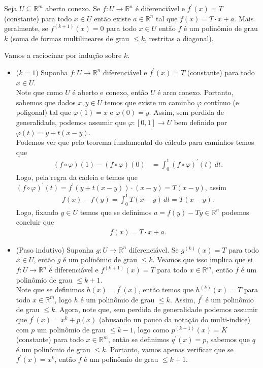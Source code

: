 \begin{homeworkProblem}[Seção 3-4]
  Seja $U\subseteq \mathbb{R}^{m}$ aberto conexo. Se $f:U\to\mathbb{R}^{n}$ é diferenciável e $f^{\prime}(x)=T$ (constante) para todo $x\in U$ então existe $a\in\mathbb{R}^{n}$ tal que $f(x)=T\cdot x+a$. Mais geralmente, se $f^{(k+1)}(x)=0$ para todo $x\in U$ então $f$ é um polinômio de grau $k$ (soma de formas multilineares de grau $\leq k$, restritas a diagonal). 
  \begin{solution}
    Vamos a raciocinar por indução sobre $k$.\\
    \begin{itemize}
      \item ($k=1$) Suponha $f:U\to\mathbb{R}^{n}$ diferenciável e $f^{\prime}(x)=T$ (constante) para todo $x\in U$.\\
        Note que como $U$ é aberto e conexo, então $U$ é arco conexo. Portanto, sabemos que dados $x,y\in U$ temos que existe un caminho $\varphi$ contínuo (e poligonal) tal que $\varphi(1)=x$ e $\varphi(0)=y$. Assim, sem perdida de generalidade, podemos assumir que $\varphi:[0,1]\to U$ bem definido por $\varphi(t)=y+t(x-y)$.\\
        Podemos ver que pelo teorema fundamental do cálculo para caminhos temos que
        \begin{align*}
          (f\circ \varphi)(1)-(f\circ \varphi)(0)&=\int_{0}^{1}(f\circ \varphi)^{\prime}(t)\,dt.
        \end{align*}
        Logo, pela regra da cadeia e temos que $(f\circ \varphi)^{\prime}(t)=f^{\prime}(y+t(x-y))\cdot (x-y)=T(x-y)$, assim 
        \begin{align*}
          f(x)-f(y)=\int_{0}^{1}T(x-y)\,dt= T(x-y).
        \end{align*}
        Logo, fixando $y\in U$ temos que se definimos $a=f(y)-Ty\in\mathbb{R}^{n}$ podemos concluir que 
        \begin{align*}
          f(x)=T\cdot x + a.
        \end{align*}
      \item (Paso indutivo) Suponha $g:U\to\mathbb{R}^{n}$ diferenciável. Se $g^{(k)}(x)=T$ para todo $x\in U$, então $g$ é um polinômio de grau $\leq k$. Veamos que isso implica que si $f:U\to\mathbb{R}^{n}$ é diferenciável e $f^{(k+1)}(x)=T$ para todo $x\in\mathbb{R}^{m}$, então $f$ é um polinômio de grau $\leq k+1$.\\
        Note que se definimos $h(x)=f^{\prime}(x)$, então temos que $h^{(k)}(x)=T$ para todo $x\in\mathbb{R}^{m}$, logo $h$ é um polinômio de grau $\leq k$. Assim, $f^{\prime}$ é um polinômio de grau $\leq k$. Agora, note que, sem perdida de generalidade podemos assumir que $f^{\prime}(x)=x^{k}+p(x)$ (abusando un pouco da notação do multi-indice) com $p$ um polinômio de grau $\leq k-1$, logo como $p^{(k-1)}(x)=K$ (constante) para todo $x\in\mathbb{R}^{m}$, então se definimos $q^{\prime}(x)=p$, sabemos que $q$ é um polinômio de grau $\leq k$. Portanto, vamos apenas verificar que se $f^{\prime}(x)=x^{k}$, então $f$ é um polinômio de grau $\leq k+1$.\\

\end{itemize}
\end{solution}
\end{homeworkProblem}

